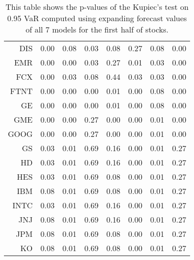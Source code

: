 \begin{table}[ht]
\begin{tabular}{rrrrrrrr}
  DIS & 0.00 & 0.08 & 0.03 & 0.08 & 0.27 & 0.08 & 0.00 \\ 
  EMR & 0.00 & 0.00 & 0.03 & 0.27 & 0.01 & 0.03 & 0.00 \\ 
  FCX & 0.00 & 0.03 & 0.08 & 0.44 & 0.03 & 0.03 & 0.00 \\ 
  FTNT & 0.00 & 0.00 & 0.00 & 0.01 & 0.00 & 0.08 & 0.00 \\ 
  GE & 0.00 & 0.00 & 0.00 & 0.01 & 0.00 & 0.08 & 0.00 \\ 
  GME & 0.00 & 0.00 & 0.27 & 0.00 & 0.00 & 0.01 & 0.00 \\ 
  GOOG & 0.00 & 0.00 & 0.27 & 0.00 & 0.00 & 0.01 & 0.00 \\ 
  GS & 0.03 & 0.01 & 0.69 & 0.16 & 0.00 & 0.01 & 0.27 \\ 
  HD & 0.03 & 0.01 & 0.69 & 0.16 & 0.00 & 0.01 & 0.27 \\ 
  HES & 0.03 & 0.01 & 0.69 & 0.08 & 0.00 & 0.01 & 0.27 \\ 
  IBM & 0.08 & 0.01 & 0.69 & 0.08 & 0.00 & 0.01 & 0.27 \\ 
  INTC & 0.03 & 0.01 & 0.69 & 0.16 & 0.00 & 0.01 & 0.27 \\ 
  JNJ & 0.08 & 0.01 & 0.69 & 0.16 & 0.00 & 0.01 & 0.27 \\ 
  JPM & 0.08 & 0.01 & 0.69 & 0.08 & 0.00 & 0.01 & 0.27 \\ 
  KO & 0.08 & 0.01 & 0.69 & 0.08 & 0.00 & 0.01 & 0.27 \\ 
   \hline
\end{tabular}
\caption[Kupiec's test p-values, alpha =0.95 (1)]{This table shows the p-values of the Kupiec's test on 0.95 VaR computed using expanding forecast values of all 7 models for the first half of stocks.} 
\label{Table:Kupiec_test_expanding_0.95_1}
\end{table}
